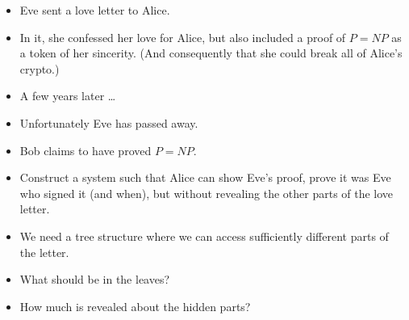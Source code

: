 \begin{frame}
  \begin{exercise}
    \begin{itemize}
      \item Eve sent a love letter to Alice.
      \item In it, she confessed her love for Alice, but also included a proof 
        of \(P = NP\) as a token of her sincerity. (And consequently that she 
        could break all of Alice's crypto.)

        \pause

      \item A few years later \dots
      \item Unfortunately Eve has passed away.
      \item Bob claims to have proved \(P = NP\).
      \item Construct a system such that Alice can show Eve's proof, prove it 
        was Eve who signed it (and when), but without revealing the other parts 
        of the love letter.
    \end{itemize}
  \end{exercise}
\end{frame}

\begin{frame}
  \begin{solution}
    \begin{itemize}
      \item We need a tree structure where we can access sufficiently different 
        parts of the letter.
    \end{itemize}
  \end{solution}

  \pause

  \begin{question}
    \begin{itemize}
      \item What should be in the leaves?
    \end{itemize}
  \end{question}

  \begin{question}
    \begin{itemize}
      \item How much is revealed about the hidden parts?
    \end{itemize}
  \end{question}
\end{frame}

